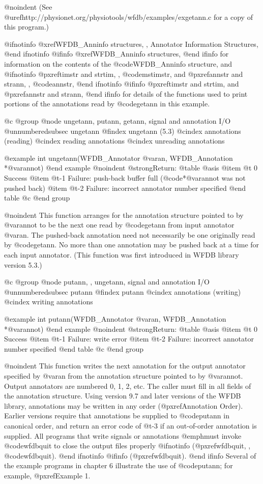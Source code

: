 {{{{{{{{@noindent
(See @uref{http://physionet.org/physiotools/wfdb/examples/exgetann.c}
for a copy of this program.)

@ifnotinfo
@xref{WFDB_Anninfo structures, , Annotator Information Structures},
@end ifnotinfo
@ifinfo
@xref{WFDB_Anninfo structures},
@end ifinfo
for information on the contents of the @code{WFDB_Anninfo} structure,
and
@ifnotinfo
@pxref{timstr and strtim, , @code{mstimstr}}, and
@pxref{annstr and strann, , @code{annstr}},
@end ifnotinfo
@ifinfo
@pxref{timstr and strtim}, and @pxref{annstr and strann},
@end ifinfo
for details of the functions used to print portions of the annotations
read by @code{getann} in this example.

@c @group
@node     ungetann, putann, getann, signal and annotation I/O
@unnumberedsubsec ungetann
@findex ungetann (5.3)
@cindex annotations (reading)
@cindex reading annotations
@cindex unreading annotations

@example
int ungetann(WFDB_Annotator @var{an}, WFDB_Annotation *@var{annot})
@end example
@noindent
@strong{Return:}
@table @asis
@item @t{ 0}
Success
@item @t{-1}
Failure: push-back buffer full (@code{*@var{annot}} was not pushed back)
@item @t{-2}
Failure: incorrect annotator number specified
@end table
@c @end group

@noindent
This function arranges for the annotation structure pointed to by
@var{annot} to be the next one read by @code{getann} from input
annotator @var{an}.  The pushed-back annotation need not necessarily be
one originally read by @code{getann}.  No more than one annotation may
be pushed back at a time for each input annotator.  (This function was
first introduced in WFDB library version 5.3.)

@c @group
@node     putann, , ungetann, signal and annotation I/O
@unnumberedsubsec putann
@findex putann
@cindex annotations (writing)
@cindex writing annotations

@example
int putann(WFDB_Annotator @var{an}, WFDB_Annotation *@var{annot})
@end example
@noindent
@strong{Return:}
@table @asis
@item @t{ 0}
Success
@item @t{-1}
Failure: write error
@item @t{-2}
Failure: incorrect annotator number specified
@end table
@c @end group

@noindent
This function writes the next annotation for the output annotator specified by
@var{an} from the annotation structure pointed to by @var{annot}.  Output
annotators are numbered 0, 1, 2, etc.  The caller must fill in all fields of
the annotation structure.  Using version 9.7 and later versions of the WFDB
library, annotations may be written in any order (@pxref{Annotation Order}).
Earlier versions require that annotations be supplied to @code{putann} in
canonical order, and return an error code of @t{-3} if an out-of-order
annotation is supplied.  All programs that write signals or annotations
@emph{must} invoke @code{wfdbquit} to close the output files properly
@ifnotinfo
(@pxref{wfdbquit, , @code{wfdbquit}}).
@end ifnotinfo
@ifinfo
(@pxref{wfdbquit}).
@end ifinfo
Several of the example programs in chapter 6 illustrate the use of
@code{putann}; for example, @pxref{Example 1}.

}}}}}}}}
